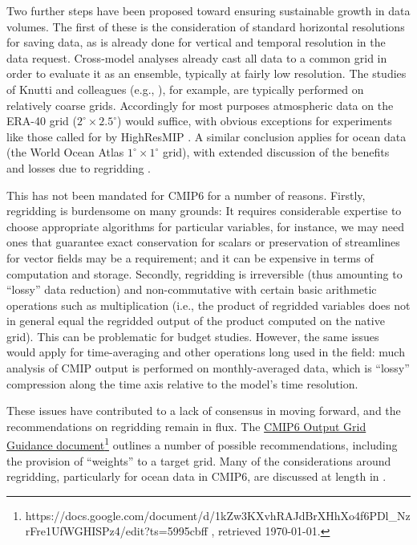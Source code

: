 \documentclass[gmd,manuscript]{copernicus}
\begin{document}
Two further steps have been proposed toward ensuring sustainable
growth in data volumes.
The first of these is the consideration of standard horizontal
resolutions for saving data, as is already done for vertical and
temporal resolution in the data request. Cross-model analyses already
cast all data to a common grid in order to evaluate it as an ensemble,
typically at fairly low resolution. The studies of Knutti and
colleagues (e.g., \cite{ref:knuttietal2017}), for example, are
typically performed on relatively coarse grids. Accordingly for most
purposes atmospheric data on the ERA-40 grid
($2^\circ\times 2.5^\circ$) would suffice, with obvious exceptions for
experiments like those called for by HighResMIP
\citep{ref:haarsmaetal2016}. A similar conclusion applies for ocean
data (the World Ocean Atlas $1^\circ\times 1^\circ$ grid), with
extended discussion of the benefits and losses due to regridding
\citep[see][]{ref:griffiesetal2014,ref:griffiesetal2016}.

This has not been mandated for CMIP6 for a number of reasons. Firstly,
regridding is burdensome on many grounds: It requires considerable
expertise to choose appropriate algorithms for particular variables,
for instance, we may need ones that guarantee exact conservation for
scalars or preservation of streamlines for vector fields may be a
requirement; and it can be expensive in terms of computation and
storage. Secondly, regridding is irreversible (thus amounting to
``lossy'' data reduction) and non-commutative with certain basic
arithmetic operations such as multiplication (i.e., the product of
regridded variables does not in general equal the regridded output of
the product computed on the native grid). This can be problematic for
budget studies. However, the same issues would apply for
time-averaging and other operations long used in the field: much
analysis of CMIP output is performed on monthly-averaged data, which
is ``lossy'' compression along the time axis relative to the model's
time resolution.

These issues have contributed to a lack of consensus in moving
forward, and the recommendations on regridding remain in flux. The
\href{https://docs.google.com/document/d/1kZw3KXvhRAJdBrXHhXo4f6PDl_NzrFre1UfWGHISPz4/edit?ts=5995cbff
}{CMIP6 Output Grid Guidance
  document}\footnote{https://docs.google.com/document/d/1kZw3KXvhRAJdBrXHhXo4f6PDl\_NzrFre1UfWGHISPz4/edit?ts=5995cbff
  , retrieved \today.} outlines a number of possible recommendations,
including the provision of ``weights'' to a target grid. Many of the
considerations around regridding, particularly for ocean data in
CMIP6, are discussed at length in \cite{ref:griffiesetal2016}.
\end{document}
